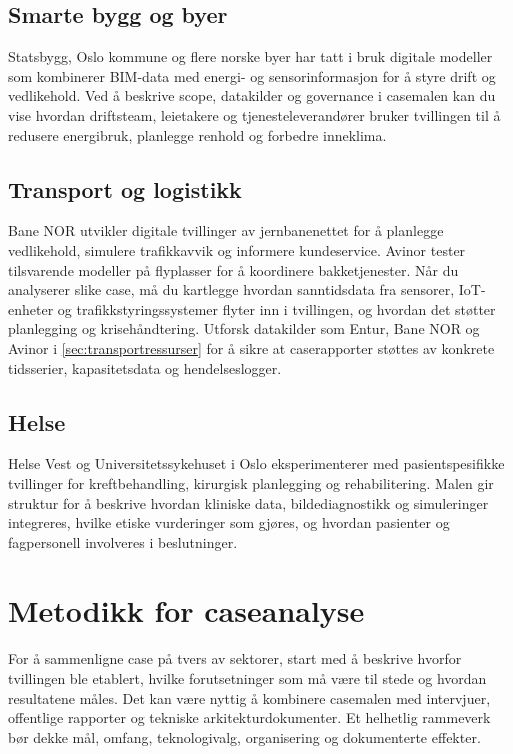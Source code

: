 \subsection*{Smarte bygg og byer}
Statsbygg, Oslo kommune og flere norske byer har tatt i bruk digitale modeller som kombinerer BIM-data med energi- og sensorinformasjon for å styre drift og vedlikehold. Ved å beskrive scope, datakilder og governance i casemalen kan du vise hvordan driftsteam, leietakere og tjenesteleverandører bruker tvillingen til å redusere energibruk, planlegge renhold og forbedre inneklima.

\subsection*{Transport og logistikk}
Bane NOR utvikler digitale tvillinger av jernbanenettet for å planlegge vedlikehold, simulere trafikkavvik og informere kundeservice. Avinor tester tilsvarende modeller på flyplasser for å koordinere bakketjenester. Når du analyserer slike case, må du kartlegge hvordan sanntidsdata fra sensorer, IoT-enheter og trafikkstyringssystemer flyter inn i tvillingen, og hvordan det støtter planlegging og krisehåndtering. Utforsk datakilder som Entur, Bane NOR og Avinor i \autoref{sec:transportressurser} for å sikre at caserapporter støttes av konkrete tidsserier, kapasitetsdata og hendelseslogger.

\subsection*{Helse}
Helse Vest og Universitetssykehuset i Oslo eksperimenterer med pasientspesifikke tvillinger for kreftbehandling, kirurgisk planlegging og rehabilitering. Malen gir struktur for å beskrive hvordan kliniske data, bildediagnostikk og simuleringer integreres, hvilke etiske vurderinger som gjøres, og hvordan pasienter og fagpersonell involveres i beslutninger.

\section{Metodikk for caseanalyse}
For å sammenligne case på tvers av sektorer, start med å beskrive hvorfor tvillingen ble etablert, hvilke forutsetninger som må være til stede og hvordan resultatene måles. Det kan være nyttig å kombinere casemalen med intervjuer, offentlige rapporter og tekniske arkitekturdokumenter. Et helhetlig rammeverk bør dekke mål, omfang, teknologivalg, organisering og dokumenterte effekter.

